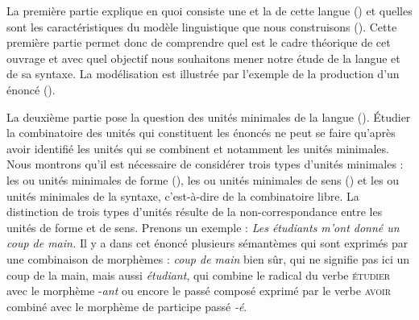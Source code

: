 La première partie explique en quoi consiste une  et la  de cette langue () et quelles sont les caractéristiques du modèle linguistique que nous construisons (). Cette première partie permet donc de comprendre quel est le cadre théorique de cet ouvrage et avec quel objectif nous souhaitons mener notre étude de la langue et de sa syntaxe. La modélisation est illustrée par l’exemple de la production d’un énoncé ().

La deuxième partie pose la question des unités minimales de la langue (). Étudier la combinatoire des unités qui constituent les énoncés ne peut se faire qu’après avoir identifié les unités qui se combinent et notamment les unités minimales. Nous montrons qu’il est nécessaire de considérer trois types d’unités minimales : les  ou unités minimales de forme (), les  ou unités minimales de sens () et les  ou unités minimales de la syntaxe, c’est-à-dire de la combinatoire libre. La distinction de trois types d’unités résulte de la non-correspondance entre les unités de forme et de sens. Prenons un exemple :
\ea
    \textit{Les étudiants m’ont donné un coup de main.}
\z
Il y a dans cet énoncé plusieurs sémantèmes qui sont exprimés par une combinaison de morphèmes : \textit{coup de main} bien sûr, qui ne signifie pas ici un coup de la main, mais aussi \textit{étudiant}, qui combine le radical du verbe \textsc{étudier} avec le morphème -\textit{ant} ou encore le passé composé exprimé par le verbe \textsc{avoir} combiné avec le morphème de participe passé \textit{{}-é}.


